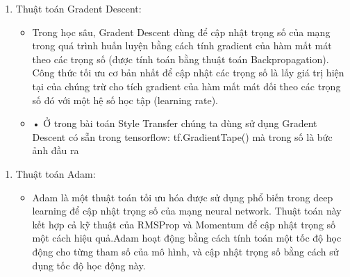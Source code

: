\documentclass{article}
\begin{document}
\begin{enumerate}
\item Thuật toán Gradent Descent:
\begin{itemize}
\item Trong học sâu, Gradent Descent dùng để cập nhật trọng số của mạng trong quá trình huấn luyện bằng cách tính gradient của hàm mất mát theo các trọng số (được tính toán bằng thuật toán Backpropagation). Công thức tối ưu cơ bản nhất để cập nhật các trọng số là lấy giá trị hiện tại của chúng trừ cho tích gradient của hàm mất mát đối theo các trọng số đó với một hệ số học tập (learning rate).
\item •	Ở trong bài toán Style Transfer chúng ta dùng sử dụng Gradent Descent có sẵn trong tensorflow: tf.GradientTape() mà trong số là bức ảnh đầu ra
\end{itemize}
\end{enumerate}

\begin{enumerate}
\item Thuật toán Adam:
\begin{itemize}
\item Adam là một thuật toán tối ưu hóa được sử dụng phổ biến trong deep learning để cập nhật trọng số của mạng neural network. Thuật toán này kết hợp cả kỹ thuật của RMSProp và Momentum để cập nhật trọng số một cách hiệu quả.Adam hoạt động bằng cách tính toán một tốc độ học động cho từng tham số của mô hình, và cập nhật trọng số bằng cách sử dụng tốc độ học động này. 
\end{itemize}
\end{enumerate}
\end{document}
